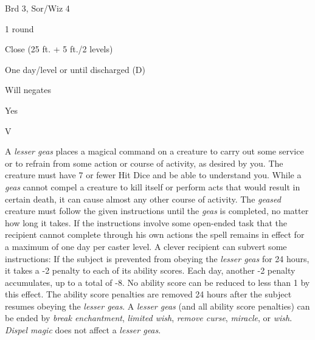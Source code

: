 
\begin{description*}
\item[Level:] Brd 3, Sor/Wiz 4
\item[Casting Time:] 1 round
\item[Range:] Close (25 ft. + 5 ft./2 levels)
\item[Duration:] One day/level or until discharged (D)
\item[Saving Throw:] Will negates
\item[Spell Resistance:] Yes
\item[Components:] V
\end{description*}

A \textit{lesser geas} places a magical command on a creature to carry out some
service or to refrain from some action or course of activity, as desired by you.
The creature must have 7 or fewer Hit Dice and be able to understand you. While
a \textit{geas} cannot compel a creature to kill itself or perform acts that would
result in certain death, it can cause almost any other course of activity.
The \textit{geased} creature must follow the given instructions until the \textit{geas
}is completed, no matter how long it takes.
If the instructions involve some open-ended task that the recipient cannot complete
through his own actions the spell remains in effect for a maximum of one day per
caster level. A clever recipient can subvert some instructions:
If the subject is prevented from obeying the \textit{lesser geas} for 24 hours,
it takes a -2 penalty to each of its ability scores. Each day, another -2 penalty
accumulates, up to a total of -8. No ability score can be reduced to less than
1 by this effect. The ability score penalties are removed 24 hours after the subject
resumes obeying the \textit{lesser geas}.
A \textit{lesser geas} (and all ability score penalties) can be ended by \textit{break
enchantment}, \textit{limited wish}, \textit{remove curse}, \textit{miracle}, or
\textit{wish}. \textit{Dispel magic} does not affect a \textit{lesser geas}.